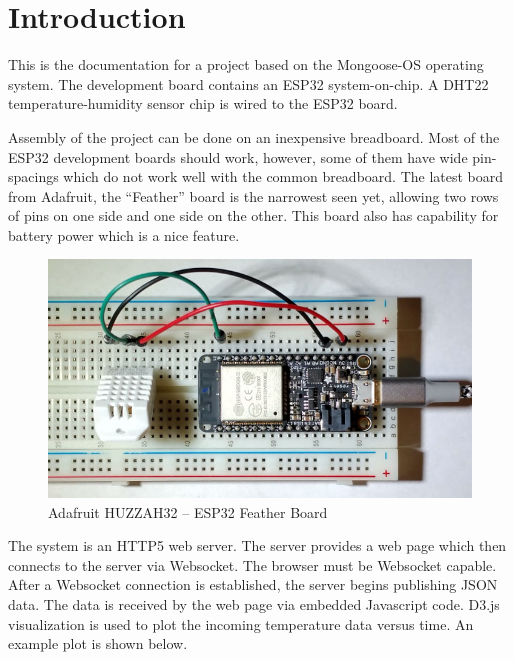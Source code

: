 \documentclass[oneside,letterpaper,12pt]{book}
\date{}
\begin{document}


{
\setcounter{tocdepth}{2}
\tableofcontents
}
\chapter{Introduction}\label{introduction}

This is the documentation for a project based on the Mongoose-OS
operating system. The development board contains an ESP32
system-on-chip. A DHT22 temperature-humidity sensor chip is wired to the
ESP32 board.

Assembly of the project can be done on an inexpensive breadboard. Most
of the ESP32 development boards should work, however, some of them have
wide pin-spacings which do not work well with the common breadboard. The
latest board from Adafruit, the ``Feather'' board is the narrowest seen
yet, allowing two rows of pins on one side and one side on the other.
This board also has capability for battery power which is a nice
feature.

\begin{figure}
\centering
\includegraphics{./adafruit-feather-medium.jpg}
\caption{Adafruit HUZZAH32 -- ESP32 Feather Board}
\end{figure}

The system is an HTTP5 web server. The server provides a web page which
then connects to the server via Websocket. The browser must be Websocket
capable. After a Websocket connection is established, the server begins
publishing JSON data. The data is received by the web page via embedded
Javascript code. D3.js visualization is used to plot the incoming
temperature data versus time. An example plot is shown below.
\end{document}

